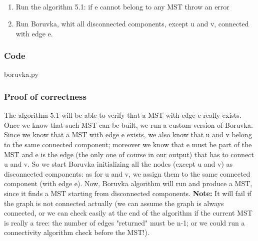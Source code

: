 \documentclass[12pt]{article}
\begin{document}
\subsection{}
\begin{enumerate}
	\item Run the algorithm 5.1: if e cannot belong to any MST throw an error
	\item Run Boruvka, whit all disconnected components, except u and v, connected with edge e.
\end{enumerate}

\subsubsection{Code}
boruvka.py
\subsubsection{Proof of correctness}
The algorithm 5.1 will be able to verify that a MST with edge e really exists. Once we know that such MST can be built, we run a custom version of Boruvka. Since we know that a MST with edge e exists, we also know that u and v belong to the same connected component; moreover we know that e must be part of the MST and e is the edge (the only one of course in our output) that has to connect u and v. So we start Boruvka initializing all the nodes (except u and v) as disconnected components: as for u and v, we assign them to the same connected component (with edge e). Now, Boruvka algorithm will run and produce a MST, since it finds a MST starting from disconnected components. \textbf{Note:} It will fail if the graph is not connected actually (we can assume the graph is always connected, or we can check easily at the end of the algorithm if the current MST is really a tree: the number of edges "returned" must be n-1; or we could run a connectivity algorithm check before the MST!). 
\end{document}

